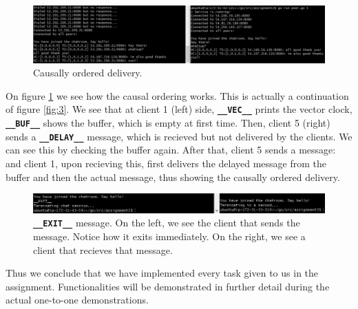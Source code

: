 \documentclass[11pt,reqno]{amsart}
\newcommand{\code}[1]{\texttt{#1}}
\begin{document}
\begin{figure}[h]
\centering
\includegraphics[width=\linewidth]{speaking.png}
\caption{Causally ordered delivery.}
\label{fig:4}
\end{figure}

On figure \ref{fig:4} we see how the causal ordering works. This is actually a continuation of figure \ref{fig:3}. We see that at client 1 (left) side, \code{\textbf{\_\_VEC\_\_}} prints the vector clock, \code{\textbf{\_\_BUF\_\_}} shows the buffer, which is empty at first time. Then, client 5 (right) sends a \code{\textbf{\_\_DELAY\_\_}} message, which is recieved but not delivered by the clients. We can see this by checking the buffer again. After that, client 5 sends a message:  and client 1, upon recieving this, first delivers the delayed message from the buffer and then the actual message, thus showing the causally ordered delivery.

\begin{figure}[h]
\centering
\includegraphics[width=\linewidth]{exit.png}
\caption{\textbf{\code{\_\_EXIT\_\_}} message. On the left, we see the client that sends the message. Notice how it exits immediately. On the right, we see a client that recieves that message.}
\label{fig:5}
\end{figure}

Thus we conclude that we have implemented every task given to us in the assignment. Functionalities will be demonstrated in further detail during the actual one-to-one demonstrations.
\end{document}
